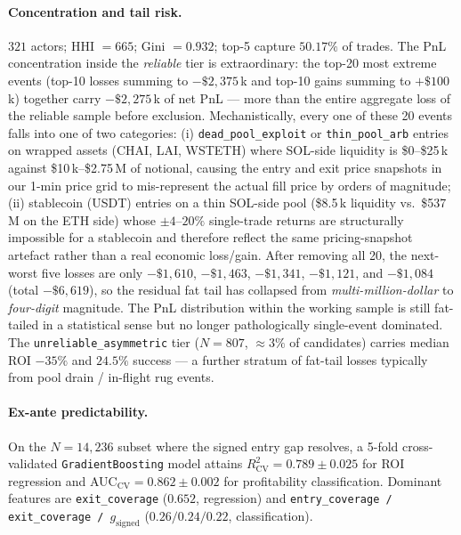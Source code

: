 \documentclass[11pt,a4paper]{article}
\newcommand{\gsigned}{g_{\text{signed}}}
\begin{document}
\paragraph{Concentration and tail risk.} $321$ actors; HHI $=665$;
Gini $=0.932$; top-5 capture $50.17\%$ of trades. The PnL
concentration inside the \emph{reliable} tier is extraordinary: the
top-20 most extreme events (top-10 losses summing to $-\$2{,}375$\,k
and top-10 gains summing to $+\$100$\,k) together carry $-\$2{,}275$\,k
of net PnL --- more than the entire aggregate loss of the reliable
sample before exclusion. Mechanistically, every one of these 20
events falls into one of two categories: (i) \texttt{dead\_pool\_exploit}
or \texttt{thin\_pool\_arb} entries on wrapped assets (CHAI, LAI,
WSTETH) where SOL-side liquidity is \$0--\$25\,k against \$10\,k--\$2.75\,M
of notional, causing the entry and exit price snapshots in our 1-min
price grid to mis-represent the actual fill price by orders of
magnitude; (ii) stablecoin (USDT) entries on a thin SOL-side pool
(\$8.5\,k liquidity vs.\ \$537\,M on the ETH side) whose $\pm\!4$--$20\%$
single-trade returns are structurally impossible for a stablecoin
and therefore reflect the same pricing-snapshot artefact rather than
a real economic loss/gain. After removing all 20, the next-worst
five losses are only $-\$1{,}610$, $-\$1{,}463$, $-\$1{,}341$,
$-\$1{,}121$, and $-\$1{,}084$ (total $-\$6{,}619$), so the residual
fat tail has collapsed from \emph{multi-million-dollar} to
\emph{four-digit} magnitude. The PnL distribution within the
working sample is still fat-tailed in a statistical sense but no
longer pathologically single-event dominated. The
\texttt{unreliable\_asymmetric} tier ($N=807$, $\approx\!3\%$ of
candidates) carries median ROI $-35\%$ and $24.5\%$ success --- a
further stratum of fat-tail losses typically from pool drain /
in-flight rug events.

\paragraph{Ex-ante predictability.} On the $N=14{,}236$ subset where the
signed entry gap resolves, a 5-fold cross-validated
\texttt{GradientBoosting} model attains $R^{2}_{\text{CV}} = 0.789 \pm
0.025$ for ROI regression and AUC$_{\text{CV}} = 0.862 \pm 0.002$ for
profitability classification. Dominant features are \texttt{exit\_coverage}
($0.652$, regression) and \texttt{entry\_coverage / exit\_coverage /
$\gsigned$} ($0.26 / 0.24 / 0.22$, classification).
\end{document}
